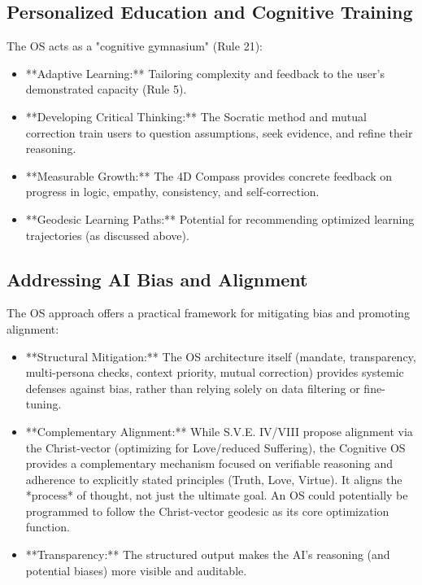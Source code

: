 \documentclass[11pt,a4paper]{article}
\theoremstyle{definition}
\theoremstyle{remark}
\begin{document}
\begin{itemize}
\subsection{Personalized Education and Cognitive Training}
The OS acts as a "cognitive gymnasium" (Rule 21):
\begin{itemize}
    \item **Adaptive Learning:** Tailoring complexity and feedback to the user's demonstrated capacity (Rule 5).
    \item **Developing Critical Thinking:** The Socratic method and mutual correction train users to question assumptions, seek evidence, and refine their reasoning.
    \item **Measurable Growth:** The 4D Compass provides concrete feedback on progress in logic, empathy, consistency, and self-correction.
    \item **Geodesic Learning Paths:** Potential for recommending optimized learning trajectories (as discussed above).
\end{itemize}

\subsection{Addressing AI Bias and Alignment}
The OS approach offers a practical framework for mitigating bias and promoting alignment:
\begin{itemize}
    \item **Structural Mitigation:** The OS architecture itself (mandate, transparency, multi-persona checks, context priority, mutual correction) provides systemic defenses against bias, rather than relying solely on data filtering or fine-tuning.
    \item **Complementary Alignment:** While S.V.E. IV/VIII propose alignment via the Christ-vector (optimizing for Love/reduced Suffering), the Cognitive OS provides a complementary mechanism focused on verifiable reasoning and adherence to explicitly stated principles (Truth, Love, Virtue). It aligns the *process* of thought, not just the ultimate goal. An OS could potentially be programmed to follow the Christ-vector geodesic as its core optimization function.
    \item **Transparency:** The structured output makes the AI's reasoning (and potential biases) more visible and auditable.


\end{itemize}
\end{itemize}
\end{document}
